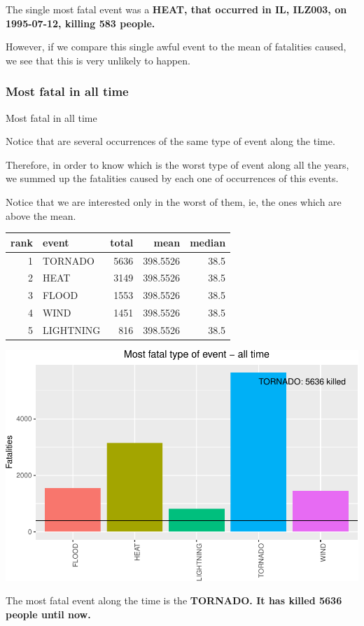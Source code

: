 \documentclass[]{article}
\begin{document}
The single most fatal event was a \textbf{HEAT, that occurred in IL,
ILZ003, on 1995-07-12, killing 583 people.}

However, if we compare this single awful event to the mean of fatalities
caused, we see that this is very unlikely to happen.

\subsubsection{Most fatal in all time}\label{most-fatal-in-all-time}

Most fatal in all time

Notice that are several occurrences of the same type of event along the
time.

Therefore, in order to know which is the worst type of event along all
the years, we summed up the fatalities caused by each one of occurrences
of this events.

Notice that we are interested only in the worst of them, ie, the ones
which are above the mean.

\begin{longtable}[]{@{}rlrrr@{}}
\toprule
rank & event & total & mean & median\tabularnewline
\midrule
\endhead
1 & TORNADO & 5636 & 398.5526 & 38.5\tabularnewline
2 & HEAT & 3149 & 398.5526 & 38.5\tabularnewline
3 & FLOOD & 1553 & 398.5526 & 38.5\tabularnewline
4 & WIND & 1451 & 398.5526 & 38.5\tabularnewline
5 & LIGHTNING & 816 & 398.5526 & 38.5\tabularnewline
\bottomrule
\end{longtable}

\includegraphics{readme_files/figure-latex/fatal-plot-alltime-1.pdf}

The most fatal event along the time is the \textbf{TORNADO. It has
killed 5636 people until now.}
\end{document}
